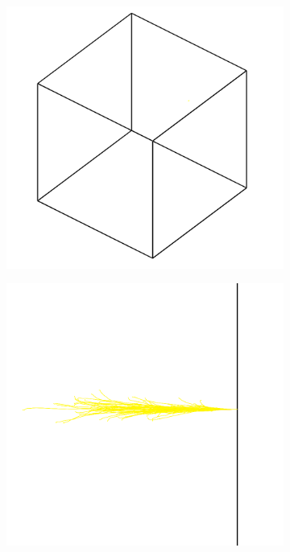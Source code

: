 \begin{figure}[!h]
\centering
\begin{subfigure}{.5\textwidth}
  \centering
  \includegraphics[width=\linewidth]{Chapter4/Figs/newSlab3d950By900.png}
  \captionsetup{width=.9\linewidth}
  \caption{}
  \label{subFig:electronsSlab3d}
\end{subfigure}%
\begin{subfigure}{.5\textwidth}
  \centering
  \includegraphics[width=\linewidth]{Chapter4/Figs/newSlabSideOnView950By900.png}

\end{subfigure}
\end{figure}
